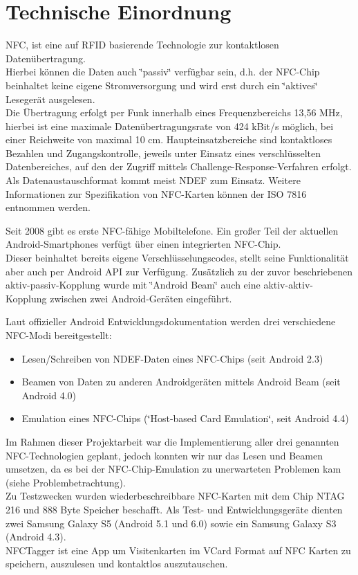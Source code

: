 \documentclass[a4paper,ngerman,12pt]{scrreprt}
\newcommand{\+}{\discretionary{\mbox{\scriptsize$\hookleftarrow$}}{}{}}
\begin{document}
\chapter{Technische Einordnung}

\ac{NFC}, ist eine auf \ac{RFID} basierende Technologie zur kontaktlosen Datenübertragung. \\
Hierbei können die Daten auch \char`\"{}passiv\char`\"{} verfügbar sein, d.\+h. der N\+F\+C-\/\+Chip beinhaltet keine eigene Stromversorgung und wird erst durch ein \char`\"{}aktives\char`\"{} Lesegerät ausgelesen. \\
Die Übertragung erfolgt per Funk innerhalb eines Frequenzbereichs 13,56 M\+Hz, hierbei ist eine maximale Datenübertragungsrate von 424 k\+Bit/s möglich, bei einer Reichweite von maximal 10 cm. 
Haupteinsatzbereiche sind kontaktloses Bezahlen und Zugangskontrolle, jeweils unter Einsatz eines verschlüsselten Datenbereiches, auf den der Zugriff mittels Challenge-\/\+Response-\/\+Verfahren erfolgt. \\
Als Datenaustauschformat kommt meist \ac{NDEF} zum Einsatz. Weitere Informationen zur Spezifikation von N\+F\+C-\/\+Karten können der I\+SO 7816 entnommen werden.\newline

Seit 2008 gibt es erste N\+F\+C-\/fähige Mobiltelefone. Ein großer Teil der aktuellen Android-Smartphones verfügt über einen integrierten N\+F\+C-\/\+Chip. \\
Dieser beinhaltet bereits eigene Verschlüsselungscodes, stellt seine Funktionalität aber auch per Android A\+PI zur Verfügung. Zusätzlich zu der zuvor beschriebenen aktiv-\/passiv-\/\+Kopplung wurde mit \char`\"{}\+Android Beam\char`\"{} auch eine aktiv-\/aktiv-\/\+Kopplung zwischen zwei Android-\/\+Geräten eingeführt.

Laut offizieller Android Entwicklungsdokumentation werden drei verschiedene N\+F\+C-\/\+Modi bereitgestellt:

\begin{itemize}
\item Lesen/\+Schreiben von N\+D\+E\+F-\/\+Daten eines N\+F\+C-\/\+Chips (seit Android 2.\+3)
\item Beamen von Daten zu anderen Androidgeräten mittels Android Beam (seit Android 4.\+0)
\item Emulation eines N\+F\+C-\/\+Chips (\char`\"{}\+Host-\/based Card Emulation\char`\"{}, seit Android 4.\+4)
\end{itemize}

Im Rahmen dieser Projektarbeit war die Implementierung aller drei genannten N\+F\+C-\/\+Technologien geplant, jedoch konnten wir nur das Lesen und Beamen umsetzen, da es bei der NFC-Chip-Emulation zu unerwarteten Problemen kam (siehe Problembetrachtung).\\ 
Zu Testzwecken wurden wiederbeschreibbare N\+F\+C-\/\+Karten mit dem Chip N\+T\+AG 216 und 888 Byte Speicher beschafft. Als Test-\/ und Entwicklungsgeräte dienten zwei Samsung Galaxy S5 (Android 5.\+1 und 6.\+0) sowie ein Samsung Galaxy S3 (Android 4.\+3). \\
N\+F\+C\+Tagger ist eine App um Visitenkarten im V\+Card Format auf N\+FC Karten zu speichern, auszulesen und kontaktlos auszutauschen.
\end{document}
